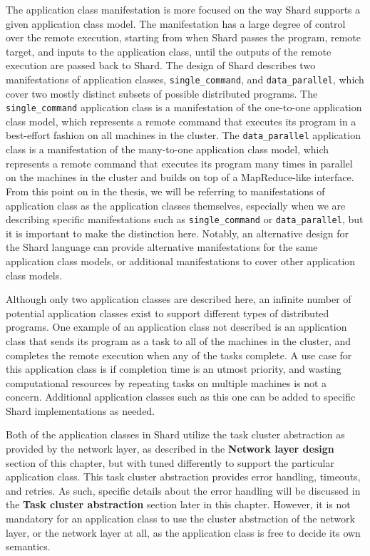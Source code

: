 \documentclass[twoside]{report}
\begin{document}
The application class manifestation is more focused on the way Shard supports a given application class model.
The manifestation has a large degree of control over the remote execution, starting from when Shard passes the program, remote target, and inputs to the application class, until the outputs of the remote execution are passed back to Shard.
The design of Shard describes two manifestations of application classes, \texttt{single\_command}, and \texttt{data\_parallel}, which cover two mostly distinct subsets of possible distributed programs.
The \texttt{single\_command} application class is a manifestation of the one-to-one application class model, which represents a remote command that executes its program in a best-effort fashion on all machines in the cluster.
The \texttt{data\_parallel} application class is a manifestation of the many-to-one application class model, which represents a remote command that executes its program many times in parallel on the machines in the cluster and builds on top of a MapReduce-like interface.
From this point on in the thesis, we will be referring to manifestations of application class as the application classes themselves, especially when we are describing specific manifestations such as \texttt{single\_command} or \texttt{data\_parallel}, but it is important to make the distinction here.
Notably, an alternative design for the Shard language can provide alternative manifestations for the same application class models, or additional manifestations to cover other application class models.

Although only two application classes are described here, an infinite number of potential application classes exist to support different types of distributed programs.
One example of an application class not described is an application class that sends its program as a task to all of the machines in the cluster, and completes the remote execution when any of the tasks complete.
A use case for this application class is if completion time is an utmost priority, and wasting computational resources by repeating tasks on multiple machines is not a concern.
Additional application classes such as this one can be added to specific Shard implementations as needed.

Both of the application classes in Shard utilize the task cluster abstraction as provided by the network layer, as described in the \textbf{Network layer design} section of this chapter, but with tuned differently to support the particular application class.
This task cluster abstraction provides error handling, timeouts, and retries.
As such, specific details about the error handling will be discussed in the \textbf{Task cluster abstraction} section later in this chapter.
However, it is not mandatory for an application class to use the cluster abstraction of the network layer, or the network layer at all, as the application class is free to decide its own semantics.
\end{document}

